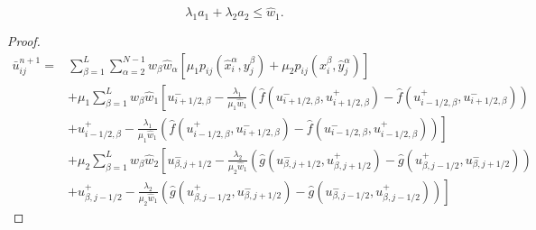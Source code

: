 \documentclass{article}
\numberwithin{equation}{subsection}    %
\begin{document}
\begin{equation}
    \lambda_{1} a_{1}+\lambda_{2} a_{2} \leq \hat{w}_{1} .
\end{equation}

\begin{proof}
    \begin{equation}
        \begin{aligned}
            \bar{u}_{i j}^{n+1}= & \sum_{\beta=1}^{L} \sum_{\alpha=2}^{N-1} w_{\beta} \hat{w}_{\alpha}\left[\mu_{1} p_{i j}\left(\hat{x}_{i}^{\alpha}, y_{j}^{\beta}\right)+\mu_{2} p_{i j}\left(x_{i}^{\beta}, \hat{y}_{j}^{\alpha}\right)\right]                                                                \\
                                 & +\mu_{1} \sum_{\beta=1}^{L} w_{\beta} \hat{w}_{1}\left[u_{i+1 / 2, \beta}^{-}-\frac{\lambda_{1}}{\mu_{1} \hat{w}_{1}}\left(\hat{f}\left(u_{i+1 / 2, \beta}^{-}, u_{i+1 / 2, \beta}^{+}\right)-\hat{f}\left(u_{i-1 / 2, \beta}^{+}, u_{i+1 / 2, \beta}^{-}\right)\right)\right. \\
                                 & \left.+u_{i-1 / 2, \beta}^{+}-\frac{\lambda_{1}}{\mu_{1} \hat{w}_{1}}\left(\hat{f}\left(u_{i-1 / 2, \beta}^{+}, u_{i+1 / 2, \beta}^{-}\right)-\hat{f}\left(u_{i-1 / 2, \beta}^{-}, u_{i-1 / 2, \beta}^{+}\right)\right)\right]                                                 \\
                                 & +\mu_{2} \sum_{\beta=1}^{L} w_{\beta} \hat{w}_{2}\left[u_{\beta, j+1 / 2}^{-}-\frac{\lambda_{2}}{\mu_{2} \hat{w}_{1}}\left(\hat{g}\left(u_{\beta, j+1 / 2}^{-}, u_{\beta, j+1 / 2}^{+}\right)-\hat{g}\left(u_{\beta, j-1 / 2}^{+}, u_{\beta, j+1 / 2}^{-}\right)\right)\right. \\
                                 & \left.+u_{\beta, j-1 / 2}^{+}-\frac{\lambda_{2}}{\mu_{2} \hat{w}_{1}}\left(\hat{g}\left(u_{\beta, j-1 / 2}^{+}, u_{\beta, j+1 / 2}^{-}\right)-\hat{g}\left(u_{\beta, j-1 / 2}^{-}, u_{\beta, j-1 / 2}^{+}\right)\right)\right]
        \end{aligned}
    \end{equation}
\end{proof}
\end{document}
